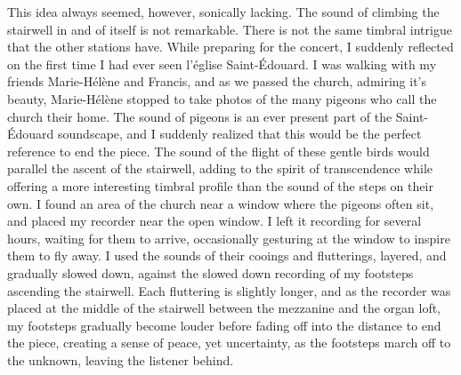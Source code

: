 \documentclass[12pt,twoside,maitrise]{dms_ks}
\theoremstyle{definition}
\begin{document}
This idea always seemed, however, sonically lacking. The sound of climbing the stairwell in and of itself is not remarkable. There is not the same timbral intrigue that the other stations have. While preparing for the concert, I suddenly reflected on the first time I had ever seen l'église Saint-Édouard. I was walking with my friends Marie-Hélène and Francis, and as we passed the church, admiring it's beauty, Marie-Hélène stopped to take photos of the many pigeons who call the church their home. The sound of pigeons is an ever present part of the Saint-Édouard soundscape, and I suddenly realized that this would be the perfect reference to end the piece. The sound of the flight of these gentle birds would parallel the ascent of the stairwell, adding to the spirit of transcendence while offering a more interesting timbral profile than the sound of the steps on their own. I found an area of the church near a window where the pigeons often sit, and placed my recorder near the open window. I left it recording for several hours, waiting for them to arrive, occasionally gesturing at the window to inspire them to fly away. I used the sounds of their cooings and flutterings, layered, and gradually slowed down, against the slowed down recording of my footsteps ascending the stairwell. Each fluttering is slightly longer, and as the recorder was placed at the middle of the stairwell between the mezzanine and the organ loft, my footsteps gradually become louder before fading off into the distance to end the piece, creating a sense of peace, yet uncertainty, as the footsteps march off to the unknown, leaving the listener behind.
\end{document}
